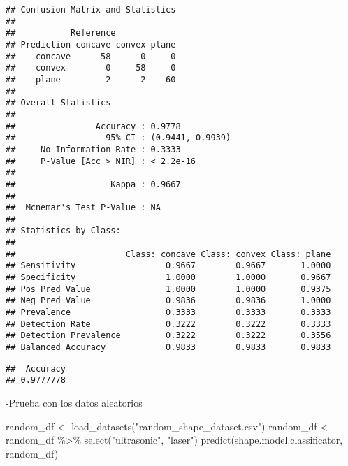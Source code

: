 \documentclass[
]{article}
\newenvironment{Shaded}{\begin{snugshade}}{\end{snugshade}}
\newcommand{\FunctionTok}[1]{\textcolor[rgb]{0.00,0.00,0.00}{#1}}
\newcommand{\NormalTok}[1]{#1}
\newcommand{\OtherTok}[1]{\textcolor[rgb]{0.56,0.35,0.01}{#1}}
\newcommand{\SpecialCharTok}[1]{\textcolor[rgb]{0.00,0.00,0.00}{#1}}
\newcommand{\StringTok}[1]{\textcolor[rgb]{0.31,0.60,0.02}{#1}}
\begin{document}
\begin{verbatim}
## Confusion Matrix and Statistics
## 
##           Reference
## Prediction concave convex plane
##    concave      58      0     0
##    convex        0     58     0
##    plane         2      2    60
## 
## Overall Statistics
##                                           
##                Accuracy : 0.9778          
##                  95% CI : (0.9441, 0.9939)
##     No Information Rate : 0.3333          
##     P-Value [Acc > NIR] : < 2.2e-16       
##                                           
##                   Kappa : 0.9667          
##                                           
##  Mcnemar's Test P-Value : NA              
## 
## Statistics by Class:
## 
##                      Class: concave Class: convex Class: plane
## Sensitivity                  0.9667        0.9667       1.0000
## Specificity                  1.0000        1.0000       0.9667
## Pos Pred Value               1.0000        1.0000       0.9375
## Neg Pred Value               0.9836        0.9836       1.0000
## Prevalence                   0.3333        0.3333       0.3333
## Detection Rate               0.3222        0.3222       0.3333
## Detection Prevalence         0.3222        0.3222       0.3556
## Balanced Accuracy            0.9833        0.9833       0.9833
\end{verbatim}

\begin{Shaded}
\end{Shaded}

\begin{verbatim}
##  Accuracy 
## 0.9777778
\end{verbatim}

-Prueba con los datos aleatorios

\begin{Shaded}
\begin{Highlighting}[]
\NormalTok{random\_df }\OtherTok{\textless{}{-}} \FunctionTok{load\_datasets}\NormalTok{(}\StringTok{"random\_shape\_dataset.csv"}\NormalTok{)}
\NormalTok{random\_df }\OtherTok{\textless{}{-}}\NormalTok{ random\_df }\SpecialCharTok{\%\textgreater{}\%} \FunctionTok{select}\NormalTok{(}\StringTok{"ultrasonic"}\NormalTok{, }\StringTok{"laser"}\NormalTok{)}
\FunctionTok{predict}\NormalTok{(shape.model.classificator, random\_df)}
\end{Highlighting}
\end{Shaded}
\end{document}
